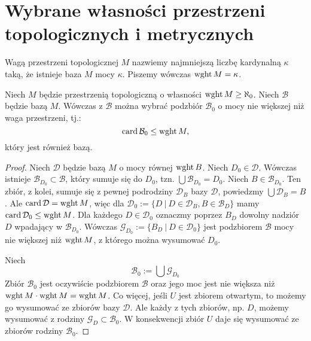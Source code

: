 \section{Wybrane własności przestrzeni topologicznych i metrycznych}

\begin{df}
  Wagą przestrzeni topologicznej $M$ nazwiemy najmniejszą liczbę kardynalną $\kappa$ taką, że istnieje baza $M$ mocy $\kappa$. Piszemy wówczas $\operatorname{wght} M = \kappa$.
\end{df}

\begin{lem}
  Niech $M$ będzie przestrzenią topologiczną o własności $\operatorname{wght} M \geq \aleph_0$. Niech $\mathcal B$ będzie bazą $M$. Wówczas z $\mathcal B$ można wybrać podzbiór $\mathcal B_0$ o mocy nie większej niż waga przestrzeni, tj.:
  \[
    \operatorname{card} \mathcal B_0 \leq \operatorname{wght} M,
  \]
  który jest również bazą.
  \begin{proof}
    Niech $\mathcal D$ będzie bazą $M$ o mocy równej $\operatorname{wght} B$. Niech $D_0 \in \mathcal D$. Wówczas istnieje $\mathcal B_{D_0} \subset \mathcal B$, który sumuje się do $D_0$, tzn. $\bigcup \mathcal B_{D_0} = D_0$. Niech $B \in \mathcal B_{D_0}$. Ten zbiór, z kolei, sumuje się z pewnej podrodziny $\mathcal D_B$ bazy $\mathcal D$, powiedzmy $\bigcup \mathcal D_B = B$. Ale $\operatorname{card}\mathcal D = \operatorname{wght} M$, więc dla $\mathcal D_0 := \{D\ |\ D \in \mathcal D_B, B \in \mathcal B_D\}$ mamy $\operatorname{card}\mathcal D_0 \leq \operatorname{wght} M$. Dla każdego $D \in \mathcal D_0$ oznaczmy poprzez $B_D$ dowolny nadziór $D$ wpadający w $\mathcal B_{D_0}$. Wówczas $\mathcal G_{D_0} := \{B_D\ |\ D \in \mathcal D_0\}$ jest podzbiorem $\mathcal B$ mocy nie większej niż $\operatorname{wght} M$, z którego można wysumować $D_0$.
    
    Niech
    \[
      \mathcal B_0 := \bigcup \mathcal G_{D_0}
    \]
    Zbiór $\mathcal B_0$ jest oczywiście podzbiorem $\mathcal B$ oraz jego moc jest nie większa niż $\operatorname{wght} M \cdot \operatorname{wght} M = \operatorname{wght} M$. Co więcej, jeśli $U$ jest zbiorem otwartym, to możemy go wysumować ze zbiorów bazy $\mathcal D$. Ale każdy z tych zbiorów, np. $D$, możemy wysumować z rodziny $\mathcal G_D \subset \mathcal B_0$. W konsekwencji zbiór $U$ daje się wysumować ze zbiorów rodziny $\mathcal B_0$.
  \end{proof}
\end{lem}

